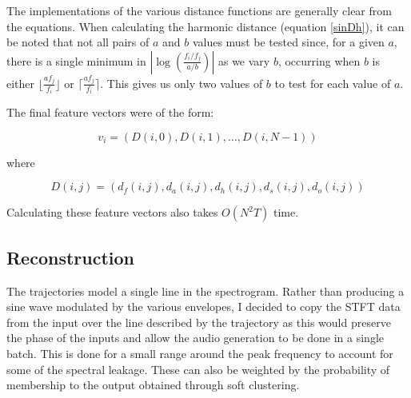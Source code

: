 \documentclass[12pt,a4paper,twoside,openright]{report}
\begin{document}
The implementations of the various distance functions are generally clear from the equations. When calculating the harmonic distance (equation \ref{sinDh}), it can be noted that not all pairs of $ a $ and $ b $ values must be tested since, for a given $ a $, there is a single minimum in $ \left| \log \left( \frac{f_i/f_j}{a/b} \right) \right| $ as we vary $ b $, occurring when $ b $ is either $ \lfloor \frac{af_j}{f_i} \rfloor $ or $ \lceil \frac{af_j}{f_i} \rceil $. This gives us only two values of $ b $ to test for each value of $ a $. 

{\color{red} The final feature vectors were of the form:

\begin{equation}
v_i = \left( D(i, 0), D(i, 1), \ldots, D(i, N-1) \right)
\end{equation}

where

\begin{equation}
D(i, j) = \left( d_f(i, j), d_a(i, j), d_h(i, j), d_s(i, j), d_o(i, j) \right)
\end{equation}

Calculating these feature vectors also takes $ O(N^2 T) $ time.

\subsection{Reconstruction}

The trajectories model a single line in the spectrogram. Rather than producing a sine wave modulated by the various envelopes, I decided to copy the STFT data from the input over the line described by the trajectory as this would preserve the phase of the inputs and allow the audio generation to be done in a single batch. This is done for a small range around the peak frequency to account for some of the spectral leakage. These can also be weighted by the probability of membership to the output obtained through soft clustering.}

\end{document}
